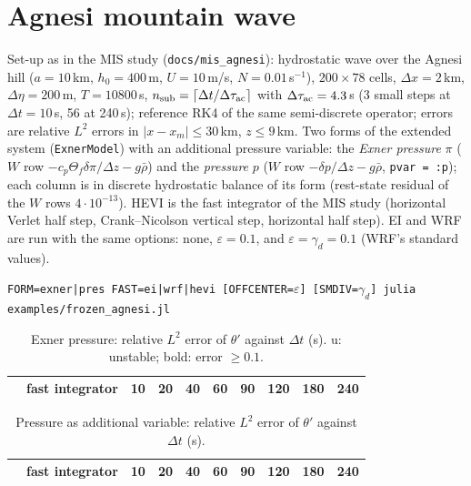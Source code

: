 \documentclass[11pt,a4paper]{article}
\newcommand{\dtau}{\Delta\tau}
\newcommand{\code}[1]{\texttt{\small #1}}
\begin{document}
\section{Agnesi mountain wave}\label{sec:agnesi}
Set-up as in the MIS study (\code{docs/mis\_agnesi}): hydrostatic wave over the Agnesi hill
($a=10$\,km, $h_0=400$\,m, $U=10$\,m/s, $N=0.01$\,s$^{-1}$), $200\times78$ cells, $\Delta x=2$\,km,
$\Delta\eta=200$\,m, $T=10800$\,s, $n_{\rm sub}=\lceil\Delta t/\dtau_{\rm ac}\rceil$ with $\dtau_{\rm ac}=4.3$\,s (3 small steps at
$\Delta t=10$\,s, 56 at 240\,s); reference RK4 of the same semi-discrete operator; errors are relative $L^2$
errors in $|x-x_m|\le30$\,km, $z\le9$\,km. Two forms of the extended system (\code{ExnerModel}) with an
additional pressure variable: the \emph{Exner pressure} $\pi$ ($W$ row $-c_p\Theta_f\delta\pi/\Delta z-g\bar\rho$) and the
\emph{pressure} $p$ ($W$ row $-\delta p/\Delta z-g\bar\rho$, \code{pvar = :p}); each column is in discrete hydrostatic
balance of its form (rest-state residual of the $W$ rows $4\cdot10^{-13}$). HEVI is the fast integrator of
the MIS study (horizontal Verlet half step, Crank--Nicolson vertical step, horizontal half step).
EI and WRF are run with the same options: none, $\varepsilon=0.1$, and $\varepsilon=\gamma_d=0.1$ (WRF's standard values).
\begin{center}\code{FORM=exner|pres FAST=ei|wrf|hevi [OFFCENTER=$\varepsilon$] [SMDIV=$\gamma_d$] julia examples/frozen\_agnesi.jl}\end{center}

\begin{table}[ht]\centering\footnotesize
\caption{Exner pressure: relative $L^2$ error of $\theta'$ against $\Delta t$ (s). u: unstable; bold: error $\ge0.1$.}\label{tab:theta}
\begin{tabular}{llcccccccc}\toprule
&fast integrator & 10 & 20 & 40 & 60 & 90 & 120 & 180 & 240\\\midrule

\bottomrule\end{tabular}
\end{table}

\begin{table}[ht]\centering\footnotesize
\caption{Pressure as additional variable: relative $L^2$ error of $\theta'$ against $\Delta t$ (s).}\label{tab:thetap}
\begin{tabular}{llcccccccc}\toprule
&fast integrator & 10 & 20 & 40 & 60 & 90 & 120 & 180 & 240\\\midrule

\bottomrule\end{tabular}
\end{table}
\end{document}
